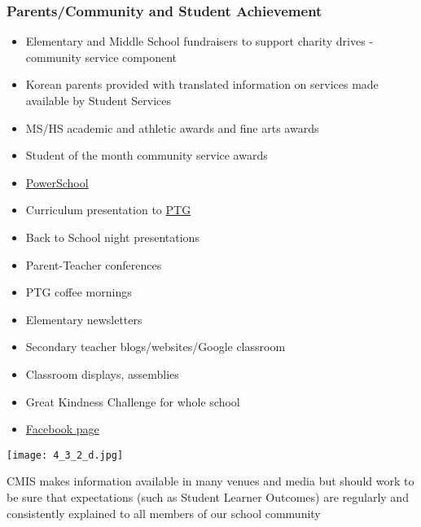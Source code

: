 \subsubsection{Parents/Community and Student Achievement}



\begin{findings}
\begin{itemize}
\item Elementary and Middle School fundraisers to support charity drives - community service component
\item Korean parents provided with translated information on services made available by Student Services 
\item MS/HS academic and athletic awards and fine arts awards
\item Student of the month community service awards 
\item \href{https://cmis.powerschool.com/public/}{PowerSchool}
\item Curriculum presentation to \href{http://blogs.cmis.ac.th/ptg/}{PTG}
\item Back to School night presentations
\item Parent-Teacher conferences 
\item PTG coffee mornings
\item Elementary newsletters
\item Secondary teacher blogs/websites/Google classroom
\item Classroom displays, assemblies
\item Great Kindness Challenge for whole school
\item \href{https://www.facebook.com/cmis.th/}{Facebook page}
\end{itemize}

{\centering\texttt{[image: 4\_3\_2\_d.jpg]}}


CMIS makes information available in many venues and media but should work to be sure that expectations (such as Student Learner Outcomes) are regularly and consistently explained to all members of our school community
\end{findings}

